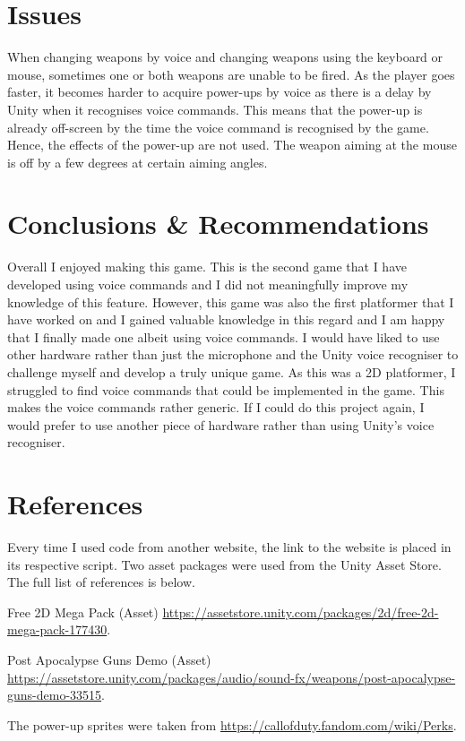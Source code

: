 \documentclass{article}
\begin{document}
\section{Issues}
When changing weapons by voice and changing weapons using the keyboard or mouse, sometimes one or both weapons are unable to be fired. As the player goes faster, it becomes harder to acquire power-ups by voice as there is a delay by Unity when it recognises voice commands. This means that the power-up is already off-screen by the time the voice command is recognised by the game. Hence, the effects of the power-up are not used. The weapon aiming at the mouse is off by a few degrees at certain aiming angles.

\section{Conclusions \& Recommendations}
Overall I enjoyed making this game. This is the second game that I have developed using voice commands and I did not meaningfully improve my knowledge of this feature. However, this game was also the first platformer that I have worked on and I gained valuable knowledge in this regard and I am happy that I finally made one albeit using voice commands. I would have liked to use other hardware rather than just the microphone and the Unity voice recogniser to challenge myself and develop a truly unique game. As this was a 2D platformer, I struggled to find voice commands that could be implemented in the game. This makes the voice commands rather generic. If I could do this project again, I would prefer to use another piece of hardware rather than using Unity's voice recogniser.

\section{References}
Every time I used code from another website, the link to the website is placed in its respective script. Two asset packages were used from the Unity Asset Store. The full list of references is below.

Free 2D Mega Pack (Asset)
\url{https://assetstore.unity.com/packages/2d/free-2d-mega-pack-177430}.

Post Apocalypse Guns Demo (Asset) \url{https://assetstore.unity.com/packages/audio/sound-fx/weapons/post-apocalypse-guns-demo-33515}.

The power-up sprites were taken from \url{https://callofduty.fandom.com/wiki/Perks}.
\end{document}

